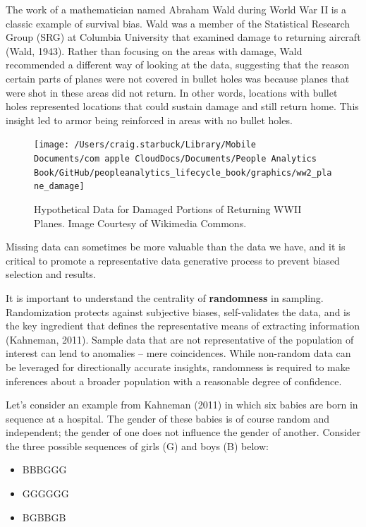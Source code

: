 \documentclass[]{book}
\providecommand{\tightlist}{%
  \setlength{\itemsep}{0pt}\setlength{\parskip}{0pt}}
\begin{document}
The work of a mathematician named Abraham Wald during World War II is a classic example of survival bias. Wald was a member of the Statistical Research Group (SRG) at Columbia University that examined damage to returning aircraft (Wald, 1943). Rather than focusing on the areas with damage, Wald recommended a different way of looking at the data, suggesting that the reason certain parts of planes were not covered in bullet holes was because planes that were shot in these areas did not return. In other words, locations with bullet holes represented locations that could sustain damage and still return home. This insight led to armor being reinforced in areas with no bullet holes.

\begin{figure}

{\centering \texttt{[image: /Users/craig.starbuck/Library/Mobile Documents/com~apple~CloudDocs/Documents/People Analytics Book/GitHub/peopleanalytics\_lifecycle\_book/graphics/ww2\_plane\_damage]} 

}

\caption{Hypothetical Data for Damaged Portions of Returning WWII Planes. Image Courtesy of Wikimedia Commons.}\label{fig:ww2-plane-damage}
\end{figure}

Missing data can sometimes be more valuable than the data we have, and it is critical to promote a representative data generative process to prevent biased selection and results.

It is important to understand the centrality of \textbf{randomness} in sampling. Randomization protects against subjective biases, self-validates the data, and is the key ingredient that defines the representative means of extracting information (Kahneman, 2011). Sample data that are not representative of the population of interest can lend to anomalies -- mere coincidences. While non-random data can be leveraged for directionally accurate insights, randomness is required to make inferences about a broader population with a reasonable degree of confidence.

Let's consider an example from Kahneman (2011) in which six babies are born in sequence at a hospital. The gender of these babies is of course random and independent; the gender of one does not influence the gender of another. Consider the three possible sequences of girls (G) and boys (B) below:

\begin{itemize}
\tightlist
\item
  BBBGGG
\item
  GGGGGG
\item
  BGBBGB
\end{itemize}
\end{document}
